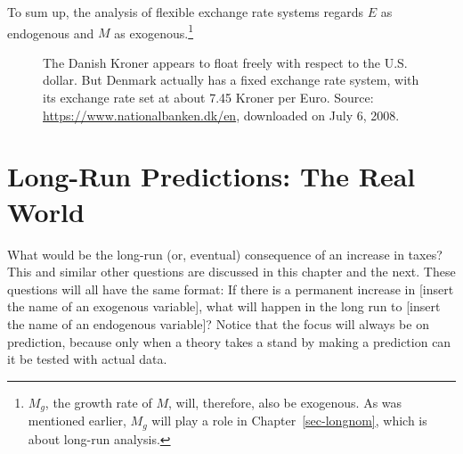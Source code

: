 \documentclass[
  letterpaper,
]{book}
\theoremstyle{plain}
\theoremstyle{remark}
\begin{document}
To sum up, the analysis of flexible exchange rate systems regards \(E\)
as endogenous and \(M\) as exogenous.\footnote{\(M_g\), the growth rate
  of \(M\), will, therefore, also be exogenous. As was mentioned
  earlier, \(M_g\) will play a role in Chapter~\ref{sec-longnom}, which
  is about long-run analysis.}

\begin{figure}


\caption{\label{fig-chart-danish-kroner}The Danish Kroner appears to
float freely with respect to the U.S. dollar. But Denmark actually has a
fixed exchange rate system, with its exchange rate set at about 7.45
Kroner per Euro. Source: \url{https://www.nationalbanken.dk/en},
downloaded on July 6, 2008.}

\end{figure}%


\chapter{Long-Run Predictions: The Real World}\label{sec-longreal}

What would be the long-run (or, eventual) consequence of an increase in
taxes? This and similar other questions are discussed in this chapter
and the next. These questions will all have the same format: If there is
a permanent increase in {[}insert the name of an exogenous variable{]},
what will happen in the long run to {[}insert the name of an endogenous
variable{]}? Notice that the focus will always be on prediction, because
only when a theory takes a stand by making a prediction can it be tested
with actual data.
\end{document}

